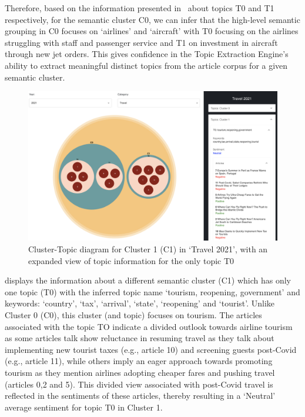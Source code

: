 Therefore, based on the information presented in~ about topics T0 and T1 respectively, for the semantic cluster C0, we can infer that the high-level semantic grouping in C0 focuses on `airlines' and `aircraft' with T0 focusing on the airlines struggling with staff and passenger service and T1 on investment in aircraft through new jet orders. This gives confidence in the Topic Extraction Engine's ability to extract meaningful distinct topics from the article corpus for a given semantic cluster. 


\begin{figure}[H]
  \centering
  \includegraphics[width=0.99\linewidth]{images/travel2021_topics_2.png}
  \caption{Cluster-Topic diagram for Cluster 1 (C1) in `Travel 2021', with an expanded view of topic information for the only topic T0}
  \label{fig:topics2_travel2021}
\end{figure}

 displays the information about a different semantic cluster (C1) which has only one topic (T0) with the inferred topic name `tourism, reopening, government' and keywords: `country', `tax', `arrival', `state', `reopening' and `tourist'. Unlike Cluster 0 (C0), this cluster (and topic) focuses on tourism. The articles associated with the topic TO indicate a divided outlook towards airline tourism as some articles talk show reluctance in resuming travel as they talk about implementing new tourist taxes (e.g., article 10) and screening guests post-Covid (e.g., article 11), while others imply an eager approach towards promoting tourism as they mention airlines adopting cheaper fares and pushing travel (articles 0,2 and 5). This divided view associated with post-Covid travel is reflected in the sentiments of these articles, thereby resulting in a `Neutral' average sentiment for topic T0 in Cluster 1.

